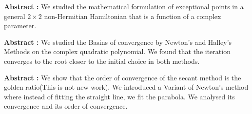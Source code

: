 \begin{cvpubs}

  \textbf{Abstract : } We studied the mathematical formulation of exceptional
  points in a general $2 \times 2$ non-Hermitian Hamiltonian that is a function
  of a complex parameter.


  \textbf{Abstract : }
  We studied the Basins of convergence by Newton's and Halley’s Methods on the complex quadratic polynomial.
  We found that the iteration converges to the root closer to the initial choice in both methods.


  \textbf{Abstract : }
  We show that the order of convergence of the secant method is the golden
  ratio(This is not new work). We introduced a Variant of Newton's method where instead of
  fitting the straight line, we fit the parabola. We analysed its convergence and its order
  of convergence.


\end{cvpubs}
